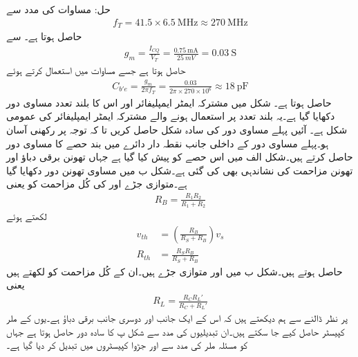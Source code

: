 حل: مساوات  کی مدد سے
\begin{align*}
f_T=41.5 \times \SI{6.5}{\mega \hertz} \approx \SI{270}{\mega \hertz}
\end{align*}
حاصل ہوتا ہے۔ سے
\begin{align*}
g_m =\frac{I_{CQ}}{V_T}=\frac{\SI{0.75}{\mA}}{\SI{25}{mV}}=\SI{0.03}{\siemens}
\end{align*}
حاصل ہوتا ہے جسے مساوات  میں استعمال کرتے ہوئے
\begin{align*}
C_{b'e}=\frac{g_m}{2 \pi f_T}=\frac{0.03}{2 \pi \times 270 \times 10^6} \approx \SI{18}{\pico \farad}
\end{align*}
حاصل ہوتا ہے۔
شکل  میں مشترکہ ایمٹر    ایمپلیفائر اور اس کا بلند تعدد مساوی دور دکھایا گیا ہے۔یہ بلند تعدد پر استعمال ہونے والے مشترکہ ایمٹر    ایمپلیفائر کی عمومی شکل ہے۔ آئیں پہلے مساوی دور کی سادہ شکل حاصل کریں تا کہ توجہ  پر رکھنی آسان ہو۔پہلے مساوی دور کے داخلی جانب نقطہ دار دائرے میں بند حصے کا مساوی  دور حاصل کرتے ہیں۔شکل  الف میں اس حصے کو پیش کیا گیا ہے جہاں تھونن برقی دباؤ  اور تھونن مزاحمت  کی نشاندہی بھی کی گئی ہے۔شکل  ب میں مساوی تھونن دور  دکھایا گیا ہے۔متوازی جڑے  اور  کی کُل مزاحمت کو  یعنی
\begin{align} \label{مساوات_تعددی_ردعمل_بیس_مزاحمت}
R_B=\frac{R_1 R_2}{R_1+R_2}
\end{align}
لکھتے ہوئے
\begin{align} \label{مساوات_تعددی_ردعمل_تھونن_اجزاء}
v_{th}&=\left(\frac{R_B}{R_S+R_B} \right) v_s \\
R_{th}&=\frac{R_S R_B}{R_S+R_B}
\end{align}
حاصل ہوتے ہیں۔شکل  ب میں  اور  متوازی جڑے ہیں۔ان کے کُل مزاحمت کو  لکھتے ہیں یعنی
\begin{align} \label{مساوات_تعددی_ردعمل_اصل_بار}
R_L=\frac{R_C R_L'}{R_C+R_L'}
\end{align}
 پر نظر ڈالنے سے ہم دیکھتے ہیں کہ اس کے ایک جانب  اور دوسری جانب  برقی دباؤ ہے۔یوں  کے ملر کپیسٹر حاصل کیے جا سکتے ہیں۔ان تبدیلیوں کی مدد سے شکل  پ کا سادہ دور حاصل ہوتا ہے جہاں  کو مسئلہ ملر کی مدد سے  اور  جڑوا کپیسٹروں میں تبدیل کر دیا گیا ہے۔
